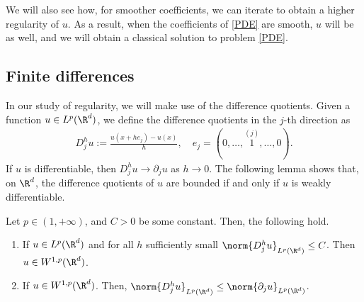 \documentclass[
    a4paper,
    DIV=14,
    abstract=true,
    numbers=noenddot
]{scrartcl}
\begin{document}
We will also see how, for smoother coefficients, we can iterate to obtain a higher regularity of $u$. As a result, when the coefficients of \eqref{PDE} are smooth, $u$ will be as well, and we will obtain a classical solution to problem \eqref{PDE}.
\subsection{Finite differences}
In our study of regularity, we will make use of the difference quotients. Given a function $u \in L^p(\R^d)$, we define the difference quotients in the $j$-th direction as
\begin{align*}
    D_j^h u := \frac{u(x+ he_j)-u(x)}{h},\quad  e_j=(0,\ldots,\overset{(j)}{1},\ldots,0).
\end{align*}
If $u$ is differentiable, then $D_j^h u \to \partial_j u$ as $h \to 0$. The following lemma shows that, on $\R^d$, the difference quotients of $u$ are bounded if and only if $u$ is weakly differentiable.
\begin{lemma}\label{difference quotients 1}
    Let $p \in (1, +\infty)$, and $C >0$ be some constant.  Then, the following hold.
    \begin{enumerate}
        \item If $u \in L^p(\R^d)$ and for all $h$ sufficiently small $\norm{D_j^h u}_{L^p(\R^d)} \leq C$. Then $u \in W^{1,p}(\R^d)$.
        \item If $u \in W^{1,p}(\R^d)$. Then, $\norm{D_j^h u}_{L^p(\R^d)} \leq \norm{\partial_j u}_{L^p(\R^d)}$.
    \end{enumerate}
\end{lemma}
\end{document}
